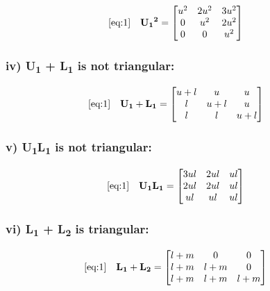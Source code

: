 \documentclass{article}
\begin{document}
\begin{align}
    \label{eq:4}
    \eqref{eq:1} &&
    \textbf{U\textsubscript{1}\textsuperscript{2}} &= 
    \begin{bmatrix}
    u\textsuperscript{2} & 2u\textsuperscript{2} & 3u\textsuperscript{2}\\
    0 & u\textsuperscript{2} & 2u\textsuperscript{2}\\
    0 & 0 & u\textsuperscript{2}
    \end{bmatrix}
\end{align}

\subsubsection*{iv) \textbf{U\textsubscript{1}} + \textbf{L\textsubscript{1}} is not triangular:}

\begin{align}
    \label{eq:5}
    \eqref{eq:1} &&
    \textbf{U\textsubscript{1}} + \textbf{L\textsubscript{1}} &=
    \begin{bmatrix}
    u + l & u & u\\
    l & u + l & u\\
    l & l & u + l
    \end{bmatrix}
\end{align}

\subsubsection*{v) \textbf{U\textsubscript{1}}\textbf{L\textsubscript{1}} is not triangular:}

\begin{align}
    \label{eq:6}
    \eqref{eq:1} &&
    \textbf{U\textsubscript{1}}\textbf{L\textsubscript{1}} &=
    \begin{bmatrix}
    3ul & 2ul & ul\\
    2ul & 2ul & ul\\
    ul & ul & ul
    \end{bmatrix}
\end{align}

\subsubsection*{vi) \textbf{L\textsubscript{1}} + \textbf{L\textsubscript{2}} is triangular:}

\begin{align}
    \label{eq:7}
    \eqref{eq:1} &&
    \textbf{L\textsubscript{1}} + \textbf{L\textsubscript{2}} &=
    \begin{bmatrix}
    l+m & 0 & 0\\
    l+m & l+m & 0\\
    l+m & l+m & l+m
    \end{bmatrix}
\end{align}
\end{document}
